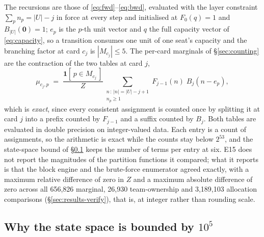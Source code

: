 \documentclass[11pt]{article}
\theoremstyle{definition}
\newcommand{\numOracleAllocChecks}{3{,}189{,}103}
\newcommand{\numOracleMargChecks}{656{,}826}
\newcommand{\numOracleTeamChecks}{26{,}930}
\begin{document}
The recursions are those of \eqref{eq:fwd}--\eqref{eq:bwd}, evaluated with the
layer constraint $\sum_p n_p = |U| - j$ in force at every step and initialised at
$F_0(q) = 1$ and $B_{|U|}(\mathbf{0}) = 1$; $e_p$ is the $p$-th unit vector and
$q$ the full capacity vector of \eqref{eq:capacity}, so a transition consumes one
unit of one seat's capacity and the branching factor at card $c_j$ is
$|M_{c_j}| \le 5$. The per-card marginals of
\S\ref{sec:counting} are the contraction of the two tables at card $j$,
\begin{equation}
  \mu_{c_j, p}
    \;=\; \frac{\mathbf{1}[\,p \in M_{c_j}\,]}{Z}
      \sum_{\substack{n \,:\, |n| = |U| - j + 1 \\ n_p \ge 1}}
        F_{j-1}(n)\; B_j(n - e_p),
  \label{eq:marg}
\end{equation}
which is \emph{exact}, since every consistent assignment is counted once by
splitting it at card $j$ into a prefix counted by $F_{j-1}$ and a suffix counted
by $B_j$. Both tables are evaluated in double
precision on integer-valued data. Each entry is a count of assignments, so the
arithmetic is exact while the counts stay below $2^{53}$, and the state-space
bound of \S\ref{app:bound} keeps the number of terms per entry at six. E15 does
not report the magnitudes of the partition functions it compared; what it
reports is that the block engine and the brute-force enumerator agreed exactly,
with a maximum relative difference of zero in $Z$ and a maximum absolute
difference of zero across all \numOracleMargChecks{} marginal,
\numOracleTeamChecks{} team-ownership and \numOracleAllocChecks{} allocation
comparisons (\S\ref{sec:results-verify}), that is, at integer rather than
rounding scale.

\subsection{Why the state space is bounded by $10^5$}
\label{app:bound}
\end{document}
